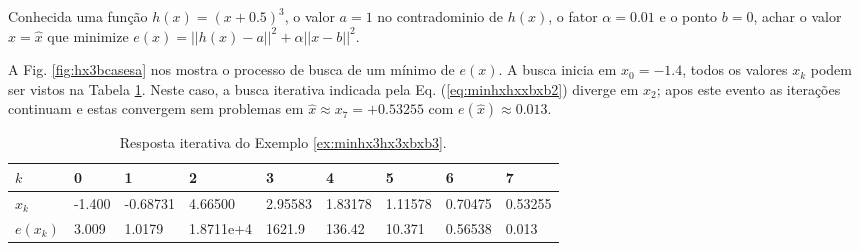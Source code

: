 \begin{example}\label{ex:minhx3hx3xbxb3}
Conhecida uma função $h(x)=(x+0.5)^3$, o valor $a=1$ no contradominio de $h(x)$,
o fator $\alpha=0.01$ e o ponto $b=0$,
achar o valor $x=\hat{x}$ que minimize $e(x)=||h(x)-a||^2+\alpha||x-b||^2$.
\end{example}
\begin{SolutionT}\label{sol:minhx3hx3xbxb3}
 A Fig. \ref{fig:hx3bcasesa} nos mostra o processo de busca de um mínimo
 de $e(x)$. 
 A busca inicia em $x_0=-1.4$,
 todos os valores $x_{k}$ podem ser vistos na Tabela \ref{tab:hx3bcases3}. 
Neste caso, a busca iterativa indicada pela Eq. (\ref{eq:minhxhxxbxb2}) diverge
em $x_2$; apos este evento as iterações continuam e estas convergem sem problemas 
em $\hat{x}\approx x_7=+0.53255$ com $e(\hat{x})\approx 0.013$.

\end{SolutionT}

\begin{table}[!h]
\centering
\begin{tabular}{|l|l|l|l|l|l|l|l|l|}
\hline
$k$      & 0 & 1 & 2 & 3 & 4 & 5 & 6 & 7 \\ \hline
$x_k$    & -1.400 & -0.68731 & 4.66500 & 2.95583 & 1.83178 & 1.11578 & 0.70475   & 0.53255 \\ \hline
$e(x_k)$ & 3.009 & 1.0179 & 1.8711e+4 & 1621.9 & 136.42 & 10.371 & 0.56538 & 0.013 \\ \hline
\end{tabular}
\caption{Resposta iterativa do Exemplo \ref{ex:minhx3hx3xbxb3}.}
\label{tab:hx3bcases3}
\end{table}

